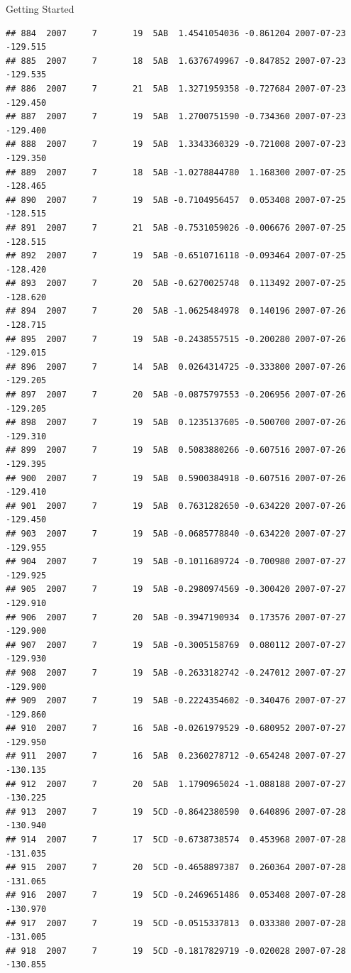 \documentclass[
  ignorenonframetext,
]{beamer}
\begin{document}
\begin{frame}[fragile]{Getting Started}
\begin{verbatim}
## 884  2007     7       19  5AB  1.4541054036 -0.861204 2007-07-23 -129.515
## 885  2007     7       18  5AB  1.6376749967 -0.847852 2007-07-23 -129.535
## 886  2007     7       21  5AB  1.3271959358 -0.727684 2007-07-23 -129.450
## 887  2007     7       19  5AB  1.2700751590 -0.734360 2007-07-23 -129.400
## 888  2007     7       19  5AB  1.3343360329 -0.721008 2007-07-23 -129.350
## 889  2007     7       18  5AB -1.0278844780  1.168300 2007-07-25 -128.465
## 890  2007     7       19  5AB -0.7104956457  0.053408 2007-07-25 -128.515
## 891  2007     7       21  5AB -0.7531059026 -0.006676 2007-07-25 -128.515
## 892  2007     7       19  5AB -0.6510716118 -0.093464 2007-07-25 -128.420
## 893  2007     7       20  5AB -0.6270025748  0.113492 2007-07-25 -128.620
## 894  2007     7       20  5AB -1.0625484978  0.140196 2007-07-26 -128.715
## 895  2007     7       19  5AB -0.2438557515 -0.200280 2007-07-26 -129.015
## 896  2007     7       14  5AB  0.0264314725 -0.333800 2007-07-26 -129.205
## 897  2007     7       20  5AB -0.0875797553 -0.206956 2007-07-26 -129.205
## 898  2007     7       19  5AB  0.1235137605 -0.500700 2007-07-26 -129.310
## 899  2007     7       19  5AB  0.5083880266 -0.607516 2007-07-26 -129.395
## 900  2007     7       19  5AB  0.5900384918 -0.607516 2007-07-26 -129.410
## 901  2007     7       19  5AB  0.7631282650 -0.634220 2007-07-26 -129.450
## 903  2007     7       19  5AB -0.0685778840 -0.634220 2007-07-27 -129.955
## 904  2007     7       19  5AB -0.1011689724 -0.700980 2007-07-27 -129.925
## 905  2007     7       19  5AB -0.2980974569 -0.300420 2007-07-27 -129.910
## 906  2007     7       20  5AB -0.3947190934  0.173576 2007-07-27 -129.900
## 907  2007     7       19  5AB -0.3005158769  0.080112 2007-07-27 -129.930
## 908  2007     7       19  5AB -0.2633182742 -0.247012 2007-07-27 -129.900
## 909  2007     7       19  5AB -0.2224354602 -0.340476 2007-07-27 -129.860
## 910  2007     7       16  5AB -0.0261979529 -0.680952 2007-07-27 -129.950
## 911  2007     7       16  5AB  0.2360278712 -0.654248 2007-07-27 -130.135
## 912  2007     7       20  5AB  1.1790965024 -1.088188 2007-07-27 -130.225
## 913  2007     7       19  5CD -0.8642380590  0.640896 2007-07-28 -130.940
## 914  2007     7       17  5CD -0.6738738574  0.453968 2007-07-28 -131.035
## 915  2007     7       20  5CD -0.4658897387  0.260364 2007-07-28 -131.065
## 916  2007     7       19  5CD -0.2469651486  0.053408 2007-07-28 -130.970
## 917  2007     7       19  5CD -0.0515337813  0.033380 2007-07-28 -131.005
## 918  2007     7       19  5CD -0.1817829719 -0.020028 2007-07-28 -130.855

\end{verbatim}
\end{frame}
\end{document}
